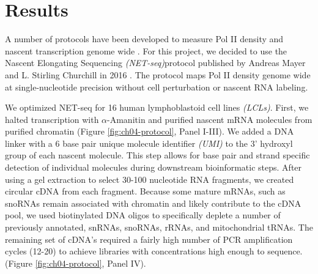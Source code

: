 \section{Results}\label{ch04-results}


A number of protocols have been developed to measure Pol II density and nascent transcription genome wide \citep{wissink_nascent_2019}. For this project, we decided to use the Nascent Elongating Sequencing \emph{(NET-seq)}protocol published by Andreas Mayer and L. Stirling Churchill in 2016 \citep{mayer_genome-wide_2016}. The protocol maps Pol II density genome wide at single-nucleotide precision without cell perturbation or nascent RNA labeling. 

We optimized NET-seq for 16 human lymphoblastoid cell lines \emph{(LCLs)}. First, we halted transcription with $\alpha$-Amanitin and purified nascent mRNA molecules from purified chromatin (Figure \ref{fig:ch04-protocol}, Panel I-III). We added a DNA linker with a 6 base pair unique molecule identifier \emph{(UMI)} to the 3' hydroxyl group of each nascent molecule. This step allows for base pair and strand specific detection of individual molecules during downstream bioinformatic steps. After using a gel extraction to select 30-100 nucleotide RNA fragments, we created circular cDNA from each fragment. Because some mature mRNAs, such as snoRNAs remain associated with chromatin and likely contribute to the cDNA pool, we used biotinylated DNA oligos to specifically deplete a number of previously annotated, snRNAs, snoRNAs, rRNAs, and mitochondrial tRNAs. The remaining set of cDNA's required a fairly high number of PCR amplification cycles (12-20) to achieve libraries with concentrations high enough to sequence. (Figure \ref{fig:ch04-protocol}, Panel IV).

